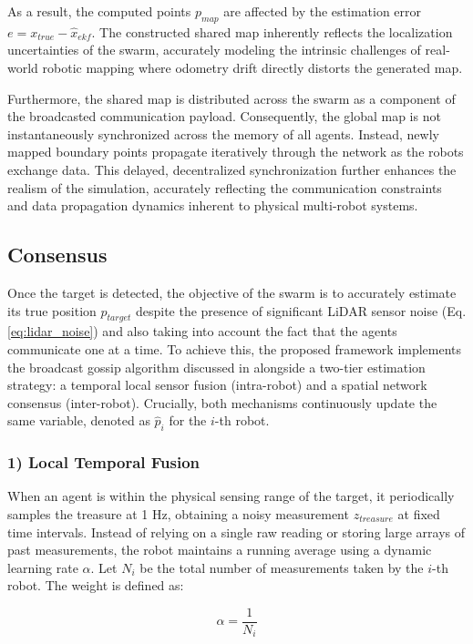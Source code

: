 \documentclass[times, twoside]{zHenriquesLab-StyleBioRxiv}
\begin{document}
As a result, the computed points $p_{map}$ are affected by the estimation error $e = x_{true} - \hat{x}_{ekf}$. The constructed shared map inherently reflects the localization uncertainties of the swarm, accurately modeling the intrinsic challenges of real-world robotic mapping where odometry drift directly distorts the generated map.

Furthermore, the shared map is distributed across the swarm as a component of the broadcasted communication payload. Consequently, the global map is not instantaneously synchronized across the memory of all agents. Instead, newly mapped boundary points propagate iteratively through the network as the robots exchange data. This delayed, decentralized synchronization further enhances the realism of the simulation, accurately reflecting the communication constraints and data propagation dynamics inherent to physical multi-robot systems.


\subsection{Consensus}
Once the target is detected, the objective of the swarm is to accurately estimate its true position $p_{target}$ despite the presence of significant LiDAR sensor noise (Eq.\ref{eq:lidar_noise}) and also taking into account the fact that the agents communicate one at a time. To achieve this, the proposed framework implements the broadcast gossip algorithm discussed in \cite{consensusUSATO} alongside a two-tier estimation strategy: a temporal local sensor fusion (intra-robot) and a spatial network consensus (inter-robot). Crucially, both mechanisms continuously update the same variable, denoted as $\hat{p}_i$ for the $i$-th robot.

\subsubsection*{1) Local Temporal Fusion}
When an agent is within the physical sensing range of the target, it periodically samples the treasure at 1 Hz, obtaining a noisy measurement $z_{treasure}$ at fixed time intervals. Instead of relying on a single raw reading or storing large arrays of past measurements, the robot maintains a running average using a dynamic learning rate $\alpha$. Let $N_i$ be the total number of measurements taken by the $i$-th robot. The weight is defined as:

\begin{equation}
    \alpha = \frac{1}{N_i}
\end{equation}
\end{document}
